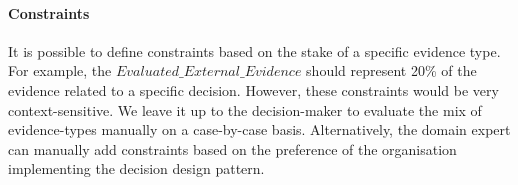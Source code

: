 \paragraph{Constraints}
It is possible to define constraints based on the stake of a specific evidence type. For example, the $Evaluated\_External\_Evidence$ should represent 20\% of the evidence related to a specific decision. However, these constraints would be very context-sensitive. We leave it up to the decision-maker to evaluate the mix of evidence-types manually on a case-by-case basis. Alternatively, the domain expert can manually add constraints based on the preference of the organisation implementing the decision design pattern.